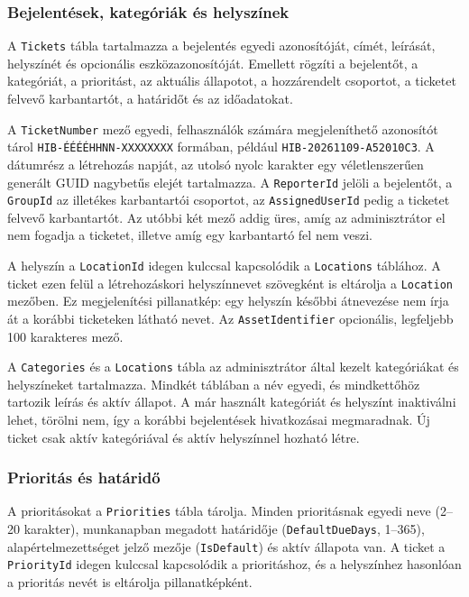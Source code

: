 \documentclass[12pt, a4paper, twoside]{article}
\begin{document}
\subsubsection{Bejelentések, kategóriák és helyszínek}

A \texttt{Tickets} tábla tartalmazza a bejelentés egyedi azonosítóját, címét, leírását, helyszínét és opcionális eszközazonosítóját. Emellett rögzíti a bejelentőt, a kategóriát, a prioritást, az aktuális állapotot, a hozzárendelt csoportot, a ticketet felvevő karbantartót, a határidőt és az időadatokat.

A \texttt{TicketNumber} mező egyedi, felhasználók számára megjeleníthető azonosítót tárol \texttt{HIB-ÉÉÉÉHHNN-XXXXXXXX} formában, például \texttt{HIB-20261109-A52010C3}. A dátumrész a létrehozás napját, az utolsó nyolc karakter egy véletlenszerűen generált GUID nagybetűs elejét tartalmazza. A \texttt{ReporterId} jelöli a bejelentőt, a \texttt{GroupId} az illetékes karbantartói csoportot, az \texttt{AssignedUserId} pedig a ticketet felvevő karbantartót. Az utóbbi két mező addig üres, amíg az adminisztrátor el nem fogadja a ticketet, illetve amíg egy karbantartó fel nem veszi.

A helyszín a \texttt{LocationId} idegen kulccsal kapcsolódik a \texttt{Locations} táblához. A ticket ezen felül a létrehozáskori helyszínnevet szövegként is eltárolja a \texttt{Location} mezőben. Ez megjelenítési pillanatkép: egy helyszín későbbi átnevezése nem írja át a korábbi ticketeken látható nevet. Az \texttt{AssetIdentifier} opcionális, legfeljebb 100 karakteres mező.

A \texttt{Categories} és a \texttt{Locations} tábla az adminisztrátor által kezelt kategóriákat és helyszíneket tartalmazza. Mindkét táblában a név egyedi, és mindkettőhöz tartozik leírás és aktív állapot. A már használt kategóriát és helyszínt inaktiválni lehet, törölni nem, így a korábbi bejelentések hivatkozásai megmaradnak. Új ticket csak aktív kategóriával és aktív helyszínnel hozható létre.

\subsubsection{Prioritás és határidő}

A prioritásokat a \texttt{Priorities} tábla tárolja. Minden prioritásnak egyedi neve (2--20 karakter), munkanapban megadott határidője (\texttt{DefaultDueDays}, 1--365), alapértelmezettséget jelző mezője (\texttt{IsDefault}) és aktív állapota van. A ticket a \texttt{PriorityId} idegen kulccsal kapcsolódik a prioritáshoz, és a helyszínhez hasonlóan a prioritás nevét is eltárolja pillanatképként.
\end{document}

